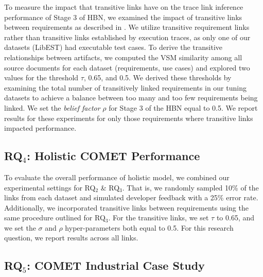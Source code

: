 To measure the impact that transitive links have on the trace link inference performance of Stage 3 of \Comets HBN, we examined the impact of transitive links between requirements as described in . We utilize transitive requirement links rather than transitive links established by execution traces, as only one of our datasets (LibEST) had executable test cases. To derive the transitive relationships between artifacts, we computed the VSM similarity among all source documents for each dataset (\eg requirements, use cases) and explored two values for the threshold $\tau$, 0.65, and 0.5. We derived these thresholds by examining the total number of transitively linked requirements in our tuning datasets to achieve a balance between too many and too few requirements being linked. We set the \textit{belief factor} $\rho$ for Stage 3 of the HBN equal to 0.5. We report results for these experiments for only those requirements where transitive links impacted \Comets performance.


\subsection{RQ$_4$: Holistic C{\footnotesize OMET} Performance}
\label{sub:study-rq4}

To evaluate the overall performance of \Comets holistic model, we combined our experimental settings for RQ$_2$ \& RQ$_3$. That is, we randomly sampled 10\% of the links from each dataset and simulated developer feedback with a 25\% error rate. Additionally, we incorporated transitive links between requirements using the same procedure outlined for RQ$_3$. For the transitive links, we set $\tau$ to 0.65, and we set the $\sigma$ and $\rho$ hyper-parameters both equal to 0.5. For this research question, we report results across all links.


\subsection{RQ$_5$: C{\footnotesize OMET} Industrial Case Study}
\label{sub:study-rq6}

